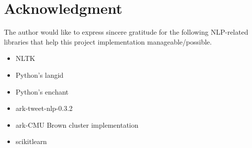 \documentclass[conference]{IEEEtran}
\begin{document}
%










\section*{Acknowledgment}


The author would like to express sincere gratitude for the following NLP-related libraries  that help this project implementation manageable/possible.
\begin{itemize}
\item NLTK
\item Python's langid
\item Python's enchant
\item ark-tweet-nlp-0.3.2
\item ark-CMU Brown cluster implementation 
\item scikitlearn
\end{itemize}
\end{document}
